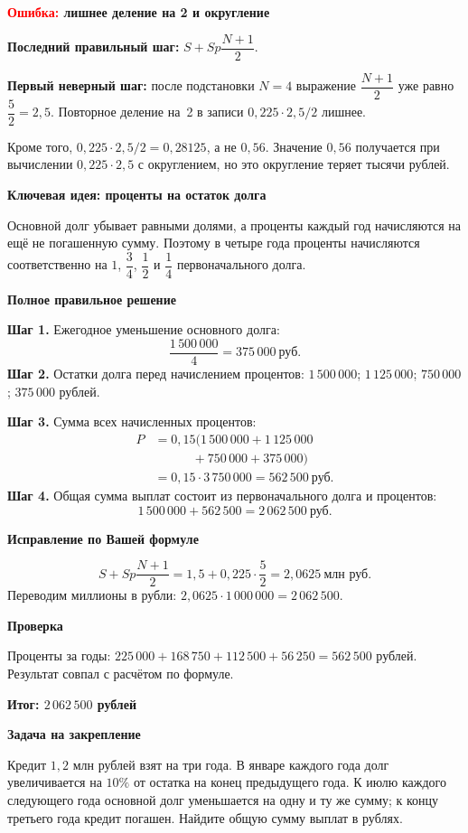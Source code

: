 \documentclass[a4paper,12pt]{article}
\newcommand{\headtxt}[1]{\par\smallskip\textbf{\textcolor{darkaccent}{#1}}\par\vspace{-1mm}}
\begin{document}
\headtxt{\textcolor{red}{Ошибка:} лишнее деление на 2 и округление}
\textbf{Последний правильный шаг:} $S+Sp\dfrac{N+1}{2}$.

\textbf{Первый неверный шаг:} после подстановки $N=4$ выражение $\dfrac{N+1}{2}$ уже равно $\dfrac52=2{,}5$. Повторное деление на~2 в записи $0{,}225\cdot2{,}5/2$ лишнее.

Кроме того, $0{,}225\cdot2{,}5/2=0{,}28125$, а не $0{,}56$. Значение $0{,}56$ получается при вычислении $0{,}225\cdot2{,}5$ с округлением, но это округление теряет тысячи рублей.

\headtxt{\textcolor{blue!60!black}{Ключевая идея:} проценты на остаток долга}
Основной долг убывает равными долями, а проценты каждый год начисляются на ещё не погашенную сумму. Поэтому в четыре года проценты начисляются соответственно на $1$, $\dfrac34$, $\dfrac12$ и $\dfrac14$ первоначального долга.

\headtxt{Полное правильное решение}
\textbf{Шаг 1.} Ежегодное уменьшение основного долга:
\[
\frac{1\,500\,000}{4}=375\,000\ \text{руб.}
\]
\textbf{Шаг 2.} Остатки долга перед начислением процентов: $1\,500\,000$; $1\,125\,000$; $750\,000$; $375\,000$ рублей.

\textbf{Шаг 3.} Сумма всех начисленных процентов:
\begin{align*}
P&=0{,}15(1\,500\,000+1\,125\,000\\
 &\qquad\quad+750\,000+375\,000)\\
 &=0{,}15\cdot3\,750\,000=562\,500\ \text{руб.}
\end{align*}
\textbf{Шаг 4.} Общая сумма выплат состоит из первоначального долга и процентов:
\[
1\,500\,000+562\,500=2\,062\,500\ \text{руб.}
\]

\headtxt{Исправление по Вашей формуле}
\[
S+Sp\frac{N+1}{2}=1{,}5+0{,}225\cdot\frac52
=2{,}0625\ \text{млн руб.}
\]
Переводим миллионы в рубли: $2{,}0625\cdot1\,000\,000=2\,062\,500$.

\headtxt{Проверка}
Проценты за годы: $225\,000+168\,750+112\,500+56\,250=562\,500$ рублей. Результат совпал с расчётом по формуле.

\headtxt{\textcolor{teal!60!black}{Итог:} $2\,062\,500$ рублей}
\headtxt{Задача на закрепление}
Кредит $1{,}2$ млн рублей взят на три года. В январе каждого года долг увеличивается на $10\%$ от остатка на конец предыдущего года. К июлю каждого следующего года основной долг уменьшается на одну и ту же сумму; к концу третьего года кредит погашен. Найдите общую сумму выплат в рублях.
\end{document}
